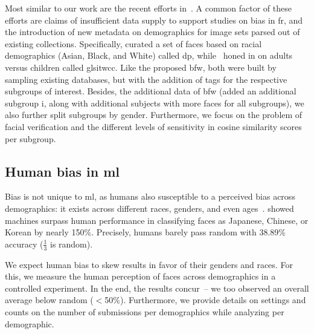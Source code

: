 Most similar to our work are the recent efforts in~\cite{das2018, demogPairs, lopez2019dataset, srinivas2019face}. A common factor of these efforts are claims of insufficient data supply to support studies on bias in \gls{fr}, and the introduction of new metadata on demographics for image sets parsed out of existing collections. Specifically, \cite{demogPairs} curated a set of faces based on racial demographics (\ie Asian, Black, and White) called \gls{dp}, while~\cite{srinivas2019face} honed in on adults versus children called gls{itwcc}. Like the proposed \gls{bfw}, both were built by sampling existing databases, but with the addition of tags for the respective subgroups of interest. Besides, the additional data of \gls{bfw} (\ie added an additional subgroup \gls{i}, along with additional subjects with more faces for all subgroups), we also further split subgroups by gender. Furthermore, we focus on the problem of facial verification and the different levels of sensitivity in cosine similarity scores per subgroup.

\subsection{Human bias in \gls{ml}}
Bias is not unique to \gls{ml}, as humans also susceptible to a perceived bias across demographics: it exists across different races, genders, and even ages~\cite{10.1007/978-3-030-13469-3_68, bar2006, meissner2001, nicholls2018}. \cite{wang2018they} showed machines surpass human performance in classifying faces as Japanese, Chinese, or Korean by nearly 150\%. Precisely, humans barely pass random with 
38.89\% accuracy (\ie $\frac{1}{3}$ is random).

We expect human bias to skew results in favor of their genders and races. For this, we measure the human perception of faces across demographics in a controlled experiment. In the end, the results concur~\cite{wang2018they}-- we too observed an overall average below random (\ie $<$50\%). Furthermore, we provide details on settings and counts on the number of submissions per demographics while analyzing per demographic.


